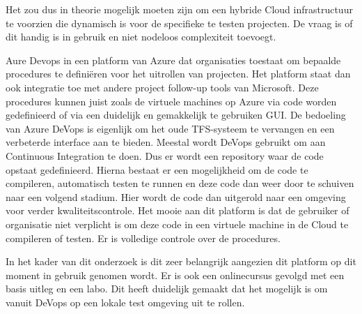 Het zou dus in theorie mogelijk moeten zijn om een hybride Cloud infrastructuur te voorzien die dynamisch is voor de specifieke te testen projecten. De vraag is of dit handig is in gebruik en niet nodeloos complexiteit toevoegt.

Aure Devops in een platform van Azure dat organisaties toestaat om bepaalde procedures te definiëren voor het uitrollen van projecten. Het platform staat dan ook integratie toe met andere project follow-up tools van Microsoft. Deze procedures kunnen juist zoals de virtuele machines op Azure via code worden gedefinieerd of via een duidelijk en gemakkelijk te gebruiken GUI. De bedoeling van Azure DeVops is eigenlijk om het oude TFS-systeem te vervangen en een verbeterde interface aan te bieden. Meestal wordt DeVops gebruikt om aan Continuous Integration te doen. Dus er wordt een repository waar de code opstaat gedefinieerd. Hierna bestaat er een mogelijkheid om de code te compileren, automatisch testen te runnen en deze code dan weer door te schuiven naar een volgend stadium. Hier wordt de code dan uitgerold naar een omgeving voor verder kwaliteitscontrole. Het mooie aan dit platform is dat de gebruiker of organisatie niet verplicht is om deze code in een virtuele machine in de Cloud te compileren of testen. Er is volledige controle over de procedures.

In het kader van dit onderzoek is dit zeer belangrijk aangezien dit platform op dit moment in gebruik genomen wordt. Er is ook een onlinecursus gevolgd met een basis uitleg en een labo. Dit heeft duidelijk gemaakt dat het mogelijk is om vanuit DeVops op een lokale test omgeving uit te rollen.

